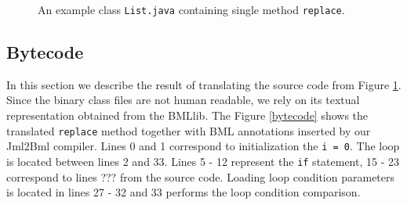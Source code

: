 \documentclass{acm_proc_article-sp}
\begin{document}
\begin{figure}
\caption{An example class \texttt{List.java} containing single method \texttt{replace}.}
\label{source}
\end{figure}
\subsection{Bytecode}
In this section we describe the result of translating the source code from Figure \ref{source}. Since the binary class files are not human readable, we rely on its textual representation obtained from the BMLlib. The Figure \ref{bytecode} shows the translated \texttt{replace} method together with BML annotations inserted by our Jml2Bml compiler. Lines 0 and 1 correspond to initialization the \texttt{i = 0}. The loop is located between lines 2 and 33. Lines 5 - 12 represent the \texttt{if} statement, 15 - 23 correspond to lines ??? from the source code. Loading loop condition parameters is located in lines 27 - 32 and 33 performs the loop condition comparison. 
\end{document}
